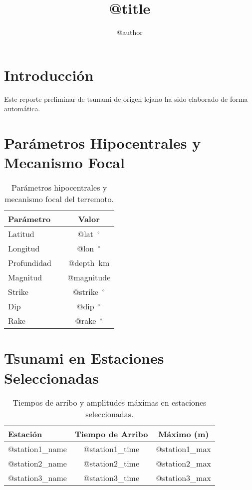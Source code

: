 \documentclass[a4paper,11pt]{article}
\title{@title}
\author{@author}
\begin{document}
\maketitle

\section*{Introducción}
Este reporte preliminar de tsunami de origen lejano ha sido elaborado de forma automática.

\section*{Parámetros Hipocentrales y Mecanismo Focal}
\begin{table}[h!]
\centering
\begin{tabular}{lcc}
\toprule
Parámetro & & Valor \\
\midrule
Latitud     & & @lat\ $^\circ$ \\
Longitud    & & @lon\ $^\circ$ \\
Profundidad & & @depth\ km \\
Magnitud    & & @magnitude \\
\midrule
Strike      & & @strike\ $^\circ$ \\
Dip         & & @dip\ $^\circ$ \\
Rake        & & @rake\ $^\circ$ \\
\bottomrule
\end{tabular}
\caption{Parámetros hipocentrales y mecanismo focal del terremoto.}
\end{table}

\section*{Tsunami en Estaciones Seleccionadas}
\begin{table}[h!]
\centering
\begin{tabular}{lcc}
\toprule
Estación & Tiempo de Arribo & Máximo (m) \\
\midrule
@station1_name & @station1_time & @station1_max \\
@station2_name & @station2_time & @station2_max \\
@station3_name & @station3_time & @station3_max \\
\bottomrule
\end{tabular}
\caption{Tiempos de arribo y amplitudes máximas en estaciones seleccionadas.}
\end{table}
\end{document}
